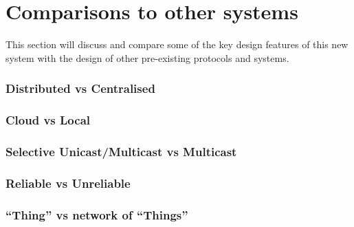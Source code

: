 


\section{Comparisons to other systems}
This section will discuss and compare some of the key design features of this new system with the design of other pre-existing protocols and systems. 

\subsubsection{Distributed vs Centralised} %
\label{ssub:distributed_vs_centralised}

\subsubsection{Cloud vs Local} %
\label{ssub:cloud_vs_local}

\subsubsection{Selective Unicast/Multicast vs Multicast} %
\label{ssub:selective_unicast_multicast_vs_multicast}

\subsubsection{Reliable vs Unreliable} %
\label{ssub:reliable_vs_unreliable}

\subsubsection{``Thing'' vs network of ``Things''} %
\label{ssub:_thing_vs_network_of_things_}

